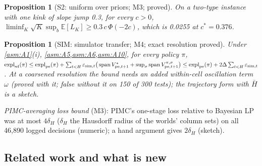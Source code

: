\documentclass[10pt]{article}
\theoremstyle{plain}
\newtheorem{proposition}[theorem]{Proposition}
\theoremstyle{definition}
\theoremstyle{remark}
\newcommand{\E}{\mathbb{E}}
\DeclareMathOperator{\expl}{expl}
\DeclareMathOperator{\spanop}{span}
\newcommand{\Hbar}{\bar H}
\newcommand{\dH}{\delta_H}
\begin{document}
\begin{proposition}[S2: uniform over priors; M3; proved]\label{prop:S2}
On a two-type instance with one kink of slope jump 0.3, for every $c>0$,
$\liminf_K\sqrt K\sup_b\E[L_K]\ge0.3\,c\,\Phi(-2c)$, which is 0.0255 at $c^*=0.376$.
\end{proposition}
\begin{proposition}[SIM: simulator transfer; M4; exact resolution proved]\label{prop:SIM}
Under \cref{asm:A1}(i), \cref{asm:A5,asm:A6,asm:A10}, for every policy $\pi$,
$\expl_{\rm sd}(\pi)\le\expl_{\rm pe}(\pi)+\sum_{t<H}\varepsilon_{{\rm sim},t}\big(\spanop V^*_{{\rm pe},t+1}
+\sup_\sigma\spanop V^{\pi,\sigma}_{{\rm pe},t+1}\big)\le\expl_{\rm pe}(\pi)+2\Delta\sum_{t<H}\varepsilon_{{\rm sim},t}$.
At a coarsened resolution the bound needs an added within-cell oscillation term $\omega$ (proved with it; false
without it on 150 of 300 tests); the trajectory form with $\Hbar$ is a sketch.
\end{proposition}
\emph{PIMC-averaging loss bound} (M3): PIMC's one-stage loss relative to Bayesian LP was at most $4\dH$ ($\dH$ the Hausdorff
radius of the worlds' column sets) on all 46,890 logged decisions (numeric); a hand argument gives $2\dH$ (sketch).

\subsection{Related work and what is new}\label{sec:relwork}
\end{document}
